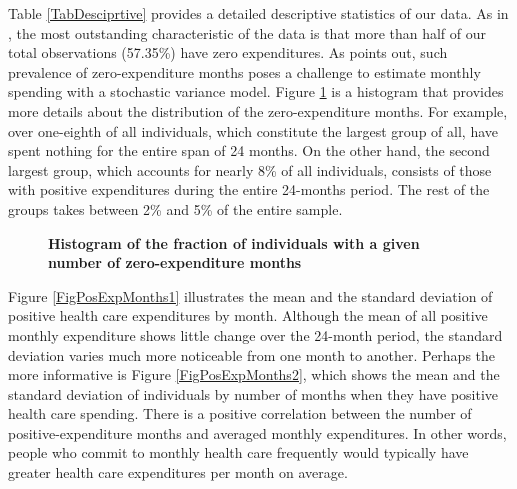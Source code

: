 \documentclass[letterpaper,12pt]{article}
\theoremstyle{definition}
\begin{document}
\begin{spacing}{1.5}{}
  Table \ref{TabDesciprtive} provides a detailed descriptive statistics of our data. As in \citet{evans}, the most outstanding characteristic of the data is that more than half of our total observations (57.35\%) have zero expenditures. As \citet{evans} points out, such prevalence of zero-expenditure months poses a challenge to estimate monthly spending with a stochastic variance model. Figure \ref{FigZeroExpMonths} is a histogram that provides more details about the distribution of the zero-expenditure months. For example, over one-eighth of all individuals, which constitute the largest group of all, have spent nothing for the entire span of 24 months. On the other hand, the second largest group, which accounts for nearly 8\% of all individuals, consists of those with positive expenditures during the entire 24-months period. The rest of the groups takes between 2\% and 5\% of the entire sample.\par
  
  \begin{figure}[h!]\centering \captionsetup{width=4.0in}
    \caption{\label{FigZeroExpMonths}\textbf{Histogram of the fraction of individuals with a given number of zero-expenditure months}}
  \end{figure}

  Figure \ref{FigPosExpMonths1} illustrates the mean and the standard deviation of positive health care expenditures by month. Although the mean of all positive monthly expenditure shows little change over the 24-month period, the standard deviation varies much more noticeable from one month to another. Perhaps the more informative is Figure \ref{FigPosExpMonths2}, which shows the mean and the standard deviation of individuals by number of months when they have positive health care spending. There is a positive correlation between the number of positive-expenditure months and averaged monthly expenditures. In other words, people who commit to monthly health care frequently would typically have greater health care expenditures per month on average.\par 
 

\end{spacing}
\end{document}
